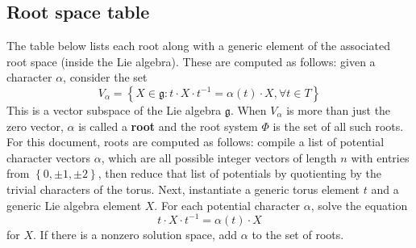 \documentclass[11pt]{article}
\newcommand{\noi}{\noindent}
\newcommand{\tbf}{\textbf}
\newcommand{\inv}{^{-1}}
\newcommand{\lb}{\left\{}
\newcommand{\rb}{\right\}}
\newcommand{\frakg}{\mathfrak{g}}
\theoremstyle{definition}
\begin{document}
\subsection{Root space table}

\noi The table below lists each root along with a generic element of the associated root space (inside the Lie algebra). These are computed as follows: given a character $\alpha$, consider the set
\[
	V_\alpha = \lb X \in \frakg : t \cdot X \cdot t \inv = \alpha(t) \cdot X, \forall t \in T \rb
\]
This is a vector subspace of the Lie algebra $\frakg$. When $V_\alpha$ is more than just the zero vector, $\alpha$ is called a \tbf{root} and the root system $\Phi$ is the set of all such roots. For this document, roots are computed as follows: compile a list of potential character vectors $\alpha$, which are all possible integer vectors of length $n$ with entries from $\lb 0, \pm 1, \pm 2 \rb$, then reduce that list of potentials by quotienting by the trivial characters of the torus. Next, instantiate a generic torus element $t$ and a generic Lie algebra element $X$. For each potential character $\alpha$, solve the equation
\[
	t \cdot X \cdot t \inv = \alpha(t) \cdot X
\]
for $X$. If there is a nonzero solution space, add $\alpha$ to the set of roots.

\bigskip
\end{document}
